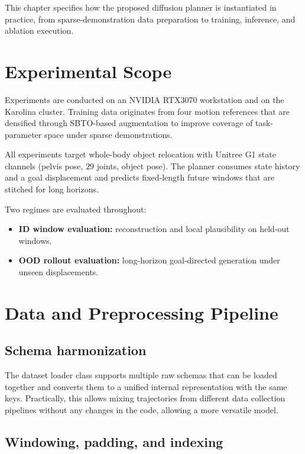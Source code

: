 This chapter specifies how the proposed diffusion planner is instantiated in practice, from sparse-demonstration data preparation to training, inference, and ablation execution.

\section{Experimental Scope}

Experiments are conducted on an NVIDIA RTX3070 workstation and on the Karolina cluster. Training data originates from four motion references that are densified through SBTO-based augmentation to improve coverage of task-parameter space under sparse demonstrations.

All experiments target whole-body object relocation with Unitree G1 state channels (pelvis pose, $29$ joints, object pose). The planner consumes state history and a goal displacement and predicts fixed-length future windows that are stitched for long horizons.

Two regimes are evaluated throughout:
\begin{itemize}
    \item \textbf{ID window evaluation:} reconstruction and local plausibility on held-out windows.
    \item \textbf{OOD rollout evaluation:} long-horizon goal-directed generation under unseen displacements.
\end{itemize}

\section{Data and Preprocessing Pipeline}

\subsection{Schema harmonization}

The dataset loader class supports multiple raw schemas that can be loaded together and converts them to a unified internal representation with the same keys. Practically, this allows mixing trajectories from different data collection pipelines without any changes in the code, allowing a more versatile model.

\subsection{Windowing, padding, and indexing}

